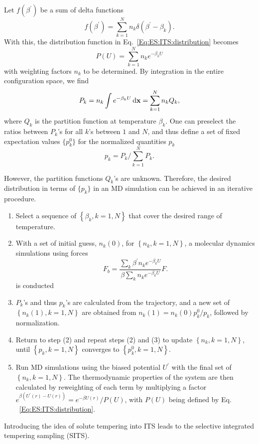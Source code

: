 Let $f(\beta^\prime)$ be a sum of delta functions
\begin{equation}
	f\left(\beta^{\prime}\right)=\sum_{k=1}^N n_k \delta\left(\beta^{\prime}-\beta_k\right) .
\end{equation}
With this, the distribution function in Eq.~\ref{Eq:ES:ITS:distribution} becomes
\begin{equation}
	P(U)=\sum_{k=1}^N n_k  e^{-\beta_k U}
\end{equation}
with weighting factors $n_k$ to be determined. By integration in  the entire configuration space, we find
\begin{equation}
	P_k= n_k \int e^{-\beta_k  U}\mathop{}\!\mathrm{d} \mathbf{x}=\sum_{k=1}^N n_k Q_k,
\end{equation}
where $Q_k$ is the partition function at temperature $\beta_k$. One can preselect the ratios between $P_k$'s for all $k$'s between $1$ and $N$, and thus define a set of fixed expectation values $\{p_k^0\}$ for the normalized quantities $p_k$
\begin{equation}
	p_k=P_k/\sum_{k=1}^N P_k.
\end{equation}

However, the partition functions $Q_k$'s are unknown. Therefore, the desired distribution in terms of $\{p_k\}$ in an MD simulation can be achieved in an iterative procedure.
\begin{enumerate}
	\item Select a sequence of $\left\{\beta_k, k=1, N\right\}$ that cover the desired range of temperature.
	\item With a set of initial guess, $n_k(0)$, for $\left\{n_k, k=1, N\right\}$, a molecular dynamics simulations using forces 
	$$
	F_b=\frac{\sum_k \beta^{\prime} n_k e^{-\beta_k U}}{\beta \sum_k n_k e^{-\beta_k U}} F .
	$$
	is conducted
	\item $P_k$'s and thus $p_k$'s are calculated from the trajectory, and a new set of $\left\{n_k(1), k=1, N\right\}$ are obtained from $n_k(1)=n_k(0) p_k^0 / p_k$, followed by normalization.
	\item Return to step (2) and repeat steps (2) and (3) to update $\left\{n_k, k=1, N\right\}$, until $\left\{p_k, k=1, N\right\}$ converges to $\left\{p_k^0, k=1, N\right\}$.
	\item Run MD simulations using the biased potential $U^\prime$ with the final set of $\left\{n_k, k=1, N\right\}$. The thermodynamic properties of the system are then calculated by reweighting of each term by multiplying a factor $e^{\beta\left(U^{\prime}(r)-U(r)\right)}=e^{-\beta U(r)} / P(U)$, with $P(U)$ being defined by Eq. ~\ref{Eq:ES:ITS:distribution}.
\end{enumerate}

Introducing the idea of solute tempering into ITS leads to the selective integrated tempering sampling (SITS).\cite{YangJCP2009}